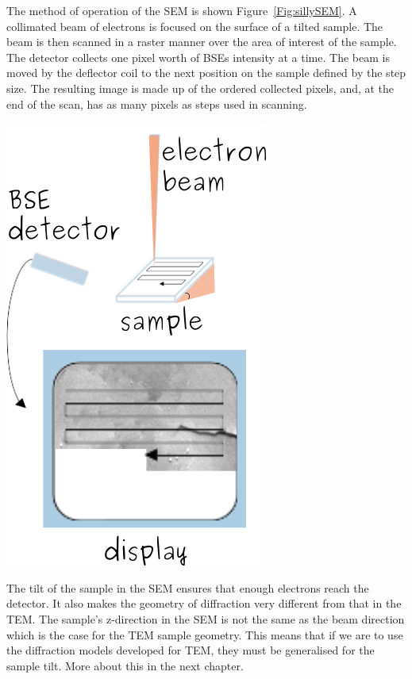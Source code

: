 \noindent\begin{minipage}{0.5\textwidth}
The method of operation of the SEM is shown Figure~\ref{Fig:sillySEM}. A collimated beam of electrons is focused on the surface of a tilted sample. The beam is then scanned in a raster manner over the area of interest of the sample. The detector collects one pixel worth of BSEs intensity at a time. The beam is moved by the deflector coil to the next position on the sample defined by the step size. The resulting image is made up of the ordered collected pixels, and, at the end of the scan, has as many pixels as steps used in scanning.  
\end{minipage}%
\begin{minipage}{0.5\textwidth}
    \centering
\includegraphics[width=0.48\linewidth]{Figures/sillySEM.png}
\captionsetup{width=.7\linewidth}
\label{Fig:sillySEM}
\end{minipage}

\vspace{0.4cm}



The tilt of the sample in the SEM ensures that  enough electrons reach the detector. It also makes the geometry of diffraction very different from that in the TEM. The sample's z-direction in the SEM is not the same as the beam direction which is the case for the TEM sample geometry. This means that if we are to use the diffraction models developed for TEM, they must be generalised for the sample tilt.  More about this in the next chapter. 

